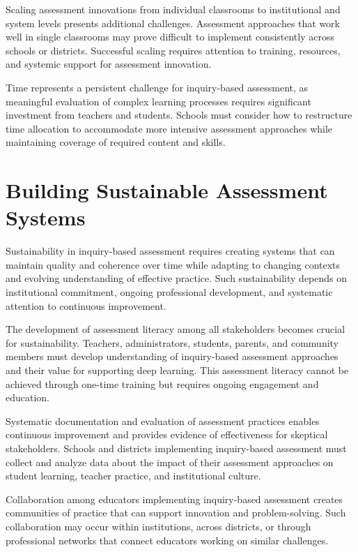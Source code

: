 \documentclass[
  Letterpaper,
]{scrbook}
\begin{document}
Scaling assessment innovations from individual classrooms to
institutional and system levels presents additional challenges.
Assessment approaches that work well in single classrooms may prove
difficult to implement consistently across schools or districts.
Successful scaling requires attention to training, resources, and
systemic support for assessment innovation.

Time represents a persistent challenge for inquiry-based assessment, as
meaningful evaluation of complex learning processes requires significant
investment from teachers and students. Schools must consider how to
restructure time allocation to accommodate more intensive assessment
approaches while maintaining coverage of required content and skills.

\section{Building Sustainable Assessment
Systems}\label{building-sustainable-assessment-systems}

Sustainability in inquiry-based assessment requires creating systems
that can maintain quality and coherence over time while adapting to
changing contexts and evolving understanding of effective practice. Such
sustainability depends on institutional commitment, ongoing professional
development, and systematic attention to continuous improvement.

The development of assessment literacy among all stakeholders becomes
crucial for sustainability. Teachers, administrators, students, parents,
and community members must develop understanding of inquiry-based
assessment approaches and their value for supporting deep learning. This
assessment literacy cannot be achieved through one-time training but
requires ongoing engagement and education.

Systematic documentation and evaluation of assessment practices enables
continuous improvement and provides evidence of effectiveness for
skeptical stakeholders. Schools and districts implementing inquiry-based
assessment must collect and analyze data about the impact of their
assessment approaches on student learning, teacher practice, and
institutional culture.

Collaboration among educators implementing inquiry-based assessment
creates communities of practice that can support innovation and
problem-solving. Such collaboration may occur within institutions,
across districts, or through professional networks that connect
educators working on similar challenges.
\end{document}
